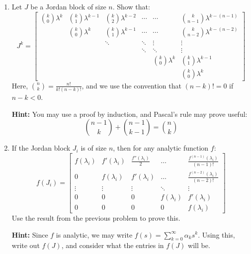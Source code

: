 \documentclass[11pt]{report}
\theoremstyle{definition}
\begin{document}
\begin{enumerate}[label = \alph*)]
\item
Let $J$ be a Jordan block of size $n$. Show that:
\[
J^k =
\begin{bmatrix}
\binom{k}{0}\lambda^k & \binom{k}{1}\lambda^{k-1} & \binom{k}{2}\lambda^{k-2} & \cdots & \cdots & \binom{k}{n-1}\lambda^{k-(n-1)} \\
 & \binom{k}{0}\lambda^k & \binom{k}{1}\lambda^{k-1} & \cdots & \cdots & \binom{k}{n-2}\lambda^{k-(n-2)} \\
 &  & \ddots & \ddots & \vdots & \vdots\\
 &  & & \ddots & \ddots & \vdots\\
 &  & &  & \binom{k}{0}\lambda^k & \binom{k}{1}\lambda^{k-1}\\
 &  &  &  &  & \binom{k}{0}\lambda^k
\end{bmatrix}
\]
Here, $\binom{n}{k} = \frac{n!}{k!(n-k)!}$, and we use the convention that $(n-k)! = 0$ if $n-k < 0$.

{\bf Hint: } You may use a proof by induction, and Pascal's rule may prove useful:
\[
\binom{n-1}{k} + \binom{n-1}{k-1} = \binom{n}{k}
\]

\item
If the Jordan block $J_i$ is of size $n$, then for any analytic function $f$:
\[
f(J_i) =
\begin{bmatrix}
f(\lambda_i) & f'(\lambda_i) & \frac{f''(\lambda_i)}{2} & \dots & \frac{f^{(n-1)}(\lambda_i)}{(n-1)!} \\
0 & f(\lambda_i) &  f'(\lambda_i) & \dots &  \frac{f^{(n-2)}(\lambda_i)}{(n-2)!} \\
\vdots & \vdots & \vdots & \ddots & \vdots \\
0 & 0 & 0 & f(\lambda_i) &  f'(\lambda_i) \\
0 & 0 & 0 & 0 & f(\lambda_i)
\end{bmatrix}
\]
Use the result from the previous problem to prove this.

\justify
{\bf Hint:} Since $f$ is analytic, we may write $f(s) = \sum_{k = 0}^\infty \alpha_k s^k$. Using this, write out $f(J)$, and consider what the entries in $f(J)$ will be.


\end{enumerate}
\end{document}
